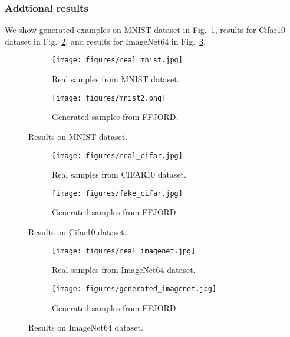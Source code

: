 \documentclass{article} \usepackage{iclr2021_conference,times}
\begin{document}
\subsubsection{Addtional results}
We show generated examples on MNIST dataset in Fig.~\ref{sup:fig:mnist}, results for Cifar10 dataset in Fig.~\ref{sup:fig:cifar}, and results for ImageNet64 in Fig.~\ref{sup:fig:imagenet}.
\begin{figure}
\begin{subfigure}{0.5\textwidth}
\centering
\texttt{[image: figures/real\_mnist.jpg]}
\caption{Real samples from MNIST dataset.}
\end{subfigure}
\begin{subfigure}{0.5\textwidth}
\centering
\texttt{[image: figures/mnist2.png]}
\caption{Generated samples from FFJORD.}
\end{subfigure}
\caption{Results on MNIST dataset.}
\label{sup:fig:mnist}
\end{figure}

\begin{figure}
\begin{subfigure}{0.5\textwidth}
\centering
\texttt{[image: figures/real\_cifar.jpg]}
\caption{Real samples from CIFAR10 dataset.}
\end{subfigure}
\begin{subfigure}{0.5\textwidth}
\centering
\texttt{[image: figures/fake\_cifar.jpg]}
\caption{Generated samples from FFJORD.}
\end{subfigure}
\caption{Results on Cifar10 dataset.}
\label{sup:fig:cifar}
\end{figure}

\begin{figure}
\begin{subfigure}{0.5\textwidth}
\centering
\texttt{[image: figures/real\_imagenet.jpg]}
\caption{Real samples from ImageNet64 dataset.}
\end{subfigure}
\begin{subfigure}{0.5\textwidth}
\centering
\texttt{[image: figures/generated\_imagenet.jpg]}
\caption{Generated samples from FFJORD.}
\end{subfigure}
\caption{Results on ImageNet64 dataset.}
\label{sup:fig:imagenet}
\end{figure}
\end{document}
